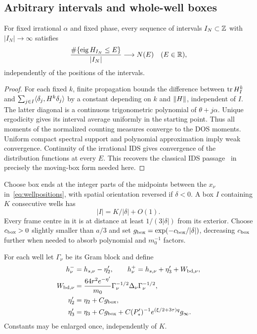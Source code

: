 \subsection{Arbitrary intervals and whole-well boxes}
\begin{inputbox}
\begin{classicalinput}
For fixed irrational $\alpha$ and fixed phase, every sequence of intervals $I_N\subset\mathbb Z$ with $|I_N|\to\infty$ satisfies
\[
 \frac{\#\{\operatorname{eig}H_{I_N}\le E\}}{|I_N|}\longrightarrow N(E)
 \quad(E\in\mathbb R),
\]
independently of the positions of the intervals.
\end{classicalinput}
\end{inputbox}
\begin{proof}
For each fixed $k$, finite propagation bounds the difference between $\operatorname{tr} H_I^k$ and $\sum_{j\in I}\langle \delta_j,H^k\delta_j\rangle$ by a constant depending on $k$ and $\lVert H\rVert$, independent of $I$. The latter diagonal is a continuous trigonometric polynomial of $\theta+j\alpha$. Unique ergodicity gives its interval average uniformly in the starting point. Thus all moments of the normalized counting measures converge to the DOS moments. Uniform compact spectral support and polynomial approximation imply weak convergence. Continuity of the irrational IDS gives convergence of the distribution functions at every $E$. This recovers the classical IDS passage~\cite{AvronSimon} in precisely the moving-box form needed here.
\end{proof}

Choose box ends at the integer parts of the midpoints between the $x_\nu$ in~\eqref{eq:wellpositions}, with spatial orientation reversed if $\delta<0$. A box $I$ containing $K$ consecutive wells has
\begin{equation}\label{eq:boxlength}
 |I|=K/|\delta|+O(1).
\end{equation}
Every frame centre in it is at distance at least $1/(3|\delta|)$ from its exterior. Choose $c_{\rm box}>0$ slightly smaller than $a/3$ and set
$g_{\rm box}=\exp(-c_{\rm box}/|\delta|)$, decreasing $c_{\rm box}$ further when needed to absorb polynomial and $m_0^{-1}$ factors.

For each well let $\Gamma_\nu$ be its Gram block and define
\begin{equation}\label{eq:boxoperators}
 \begin{split}
 h_\nu^-&=h_{s,\nu}-\eta_2',\qquad
 h_\nu^+=h_{s,\nu}+\eta_3'+W_{{\rm bd},\nu},\\
 W_{{\rm bd},\nu}&=\frac{64r^2e^{-\eta'}}{m_0}
                 \Gamma_\nu^{-1/2}\Delta_\nu\Gamma_\nu^{-1/2},\\
 \eta_2'&=\eta_2+Cg_{\rm box},\\
 \eta_3'&=\eta_3+Cg_{\rm box}
       +C(P_*')^{-1}e^{(\xi/2+3\tau)q}g_\infty.
 \end{split}
\end{equation}
Constants may be enlarged once, independently of $K$.

